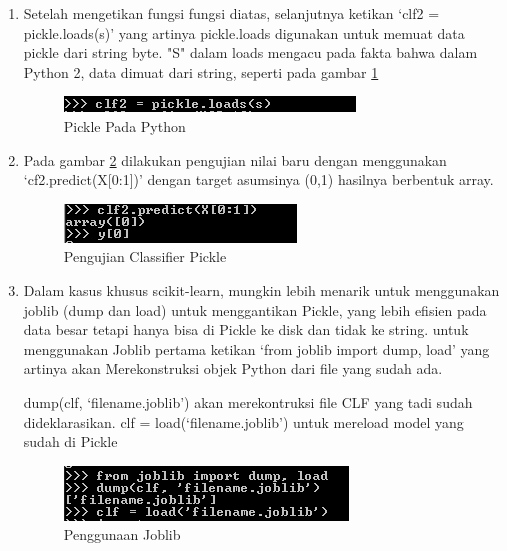 \begin{enumerate}
\item Setelah mengetikan fungsi fungsi diatas, selanjutnya ketikan `clf2 = pickle.loads(s)' yang artinya pickle.loads digunakan untuk memuat data pickle dari string byte. "S" dalam loads mengacu pada fakta bahwa dalam Python 2, data dimuat dari string, seperti pada gambar \ref{gambar8}
\begin{figure}
	\begin{center}
   	 \includegraphics[scale=1]{figures/tasya9.png}
   	 \caption{Pickle Pada Python}
     \label{gambar8}	
	\end{center}
\end{figure}

\item Pada gambar \ref{gambar9} dilakukan pengujian nilai baru dengan menggunakan `cf2.predict(X[0:1])' dengan target asumsinya (0,1) hasilnya berbentuk array.
\begin{figure}
	\begin{center}
   	 \includegraphics[scale=1]{figures/tasya10.png}
   	 \caption{Pengujian Classifier Pickle}
    \label{gambar9}	
	\end{center}
\end{figure}

\item Dalam kasus khusus scikit-learn, mungkin lebih menarik untuk menggunakan joblib (dump dan load) untuk menggantikan Pickle, yang lebih efisien pada data besar tetapi hanya bisa di Pickle ke disk dan tidak ke string. untuk menggunakan Joblib pertama ketikan `from joblib import dump, load' yang artinya akan Merekonstruksi objek Python dari file yang sudah ada.

dump(clf, `filename.joblib') akan merekontruksi file CLF yang tadi sudah dideklarasikan.
clf = load(`filename.joblib') untuk mereload model yang sudah di Pickle
\begin{figure}
	\begin{center}
   	 \includegraphics[scale=1]{figures/tasya11.png}
   	 \caption{Penggunaan Joblib}	
	\end{center}
\end{figure}
\end{enumerate}